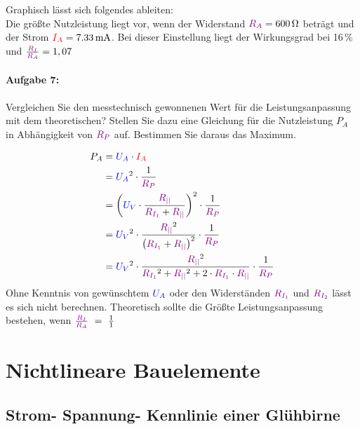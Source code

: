 \documentclass[a4paper,titlepage,parskip]{scrreprt}
\newcommand{\spannung}[1]{\textcolor{blue}{#1}}
\newcommand{\strom}[1]{\textcolor{red}{#1}}
\newcommand{\widerstand}[1]{\textcolor{violet}{#1}}
\begin{document}
           Graphisch lässt sich folgendes ableiten:\\
           Die größte Nutzleistung liegt vor, wenn der Widerstand $\widerstand{R_A} =  \SI{600}{\ohm}$ beträgt und der Strom $\strom{I_A} = \SI{7,33}{\milli\ampere}$. Bei dieser Einstellung liegt der Wirkungsgrad bei 16\,\% und $\frac{\widerstand{R_I}}{\widerstand{R_A}} = 1,07$
                      

           \subsubsection{Aufgabe 7:} Vergleichen Sie den messtechnisch gewonnenen Wert für die Leistungsanpassung mit dem theoretischen? Stellen Sie dazu eine Gleichung für die Nutzleistung $P_A$ in Abhängigkeit von $\widerstand{R_P}$ auf. Bestimmen Sie daraus das Maximum.
           
           \begin{align*}
               P_A  &= \spannung{U_A} \cdot \strom{I_A}\\
               &= \spannung{U_A}^2 \cdot \frac{1}{\widerstand{R_P}}\\
               &= \left(\spannung{U_V} \cdot \frac{\widerstand{R_{||}}}{\widerstand{R_{I_1}} + \widerstand{R_{||}}}\right)^2 \cdot \frac{1}{\widerstand{R_P}}\\
               &= \spannung{U_V}^2 \cdot \frac{\widerstand{R_{||}}^2}{\left(\widerstand{R_{I_1}} + \widerstand{R_{||}}\right)^2} \cdot \frac{1}{\widerstand{R_P}}\\
               &= \spannung{U_V}^2 \cdot \frac{\widerstand{R_{||}}^2}{\widerstand{R_{I_1}}^2 + \widerstand{R_{||}}^2 + 2 \cdot \widerstand{R_{I_1}}\cdot \widerstand{R_{||}}} \cdot \frac{1}{\widerstand{R_P}}\\
           \end{align*}
           Ohne Kenntnis von gewünschtem $\spannung{U_A}$ oder den Widerständen $\widerstand{R_{I_1}}$ und $\widerstand{R_{I_2}}$ lässt es sich nicht berechnen. Theoretisch sollte die Größte Leistungsanpassung bestehen, wenn $\frac{\widerstand{R_I}}{\widerstand{R_A}}~=~\frac{1}{1}$


    \chapter{Nichtlineare Bauelemente}


        \section{Strom- Spannung- Kennlinie einer Glühbirne}
\end{document}
